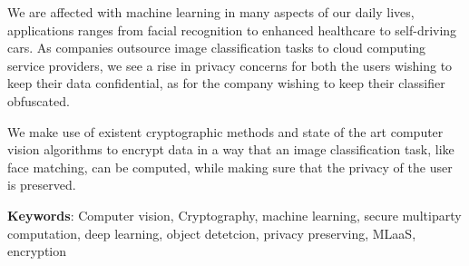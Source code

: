 We are affected with machine learning in many aspects of our daily lives, applications ranges from facial recognition to enhanced healthcare to self-driving cars. As companies outsource image classification tasks to cloud computing service providers, we see a rise in privacy concerns for both the users wishing to keep their data confidential, as for the company wishing to keep their classifier obfuscated.

We make use of existent cryptographic methods and state of the art computer vision algorithms to encrypt data in a way that an image classification task, like face matching, can be computed, while making sure that the privacy of the user is preserved.

\textbf{Keywords}: Computer vision, Cryptography, machine learning, secure multiparty computation, deep learning, object detetcion, privacy preserving, MLaaS, encryption
